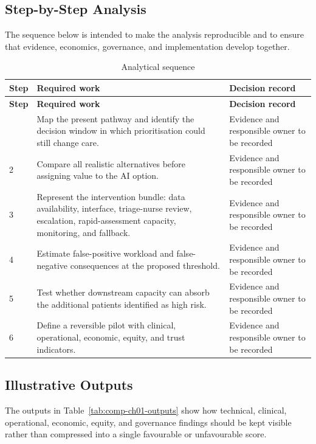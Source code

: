 \subsection{Step-by-Step Analysis}
The sequence below is intended to make the analysis reproducible and to ensure
that evidence, economics, governance, and implementation develop together.

\begin{longtable}{@{}p{}p{}p{}@{}}
\caption{Analytical sequence}
\label{tab:comp-ch01-analysis-steps}\\
\toprule
\textbf{Step} & \textbf{Required work} & \textbf{Decision record} \\
\midrule
\endfirsthead
\toprule
\textbf{Step} & \textbf{Required work} & \textbf{Decision record} \\
\midrule
\endhead
\bottomrule
\endlastfoot
1 & Map the present pathway and identify the decision window in which prioritisation could still change care. & Evidence and responsible owner to be recorded \\
2 & Compare all realistic alternatives before assigning value to the AI option. & Evidence and responsible owner to be recorded \\
3 & Represent the intervention bundle: data availability, interface, triage-nurse review, escalation, rapid-assessment capacity, monitoring, and fallback. & Evidence and responsible owner to be recorded \\
4 & Estimate false-positive workload and false-negative consequences at the proposed threshold. & Evidence and responsible owner to be recorded \\
5 & Test whether downstream capacity can absorb the additional patients identified as high risk. & Evidence and responsible owner to be recorded \\
6 & Define a reversible pilot with clinical, operational, economic, equity, and trust indicators. & Evidence and responsible owner to be recorded \\
\end{longtable}

\subsection{Illustrative Outputs}
The outputs in Table~\ref{tab:comp-ch01-outputs} show how technical,
clinical, operational, economic, equity, and governance findings should be kept
visible rather than compressed into a single favourable or unfavourable score.

